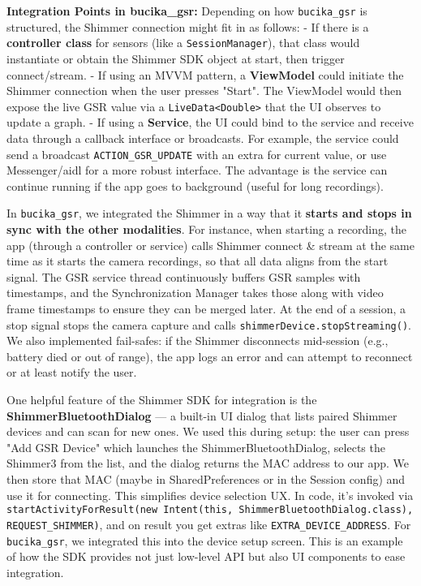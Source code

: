 \textbf{Integration Points in bucika_gsr:} Depending on how \texttt{bucika_gsr} is
structured, the Shimmer connection might fit in as follows: - If there
is a \textbf{controller class} for sensors (like a \texttt{SessionManager}), that
class would instantiate or obtain the Shimmer SDK object at start, then
trigger connect/stream. - If using an MVVM pattern, a \textbf{ViewModel}
could initiate the Shimmer connection when the user presses "Start". The
ViewModel would then expose the live GSR value via a \texttt{LiveData<Double>}
that the UI observes to update a graph. - If using a \textbf{Service}, the UI
could bind to the service and receive data through a callback interface
or broadcasts. For example, the service could send a broadcast
\texttt{ACTION_GSR_UPDATE} with an extra for current value, or use
Messenger/aidl for a more robust interface. The advantage is the service
can continue running if the app goes to background (useful for long
recordings).

In \texttt{bucika_gsr}, we integrated the Shimmer in a way that it \textbf{starts and
stops in sync with the other modalities}. For instance, when starting a
recording, the app (through a controller or service) calls Shimmer
connect & stream at the same time as it starts the camera recordings, so
that all data aligns from the start
signal\cite{MainViewModel}\cite{MainViewModel}.
The GSR service thread continuously buffers GSR samples with timestamps,
and the Synchronization Manager takes those along with video frame
timestamps to ensure they can be merged later. At the end of a session,
a stop signal stops the camera capture and calls
\texttt{shimmerDevice.stopStreaming()}. We also implemented fail-safes: if the
Shimmer disconnects mid-session (e.g., battery died or out of range),
the app logs an error and can attempt to reconnect or at least notify
the user.

One helpful feature of the Shimmer SDK for integration is the
\textbf{ShimmerBluetoothDialog} --- a built-in UI dialog that lists paired
Shimmer devices and can scan for new
ones\cite{DeviceServer}.
We used this during setup: the user can press "Add GSR Device" which
launches the ShimmerBluetoothDialog, selects the Shimmer3 from the list,
and the dialog returns the MAC address to our
app\cite{DeviceServer}.
We then store that MAC (maybe in SharedPreferences or in the Session
config) and use it for connecting. This simplifies device selection UX.
In code, it's invoked via
\texttt{startActivityForResult(new Intent(this, ShimmerBluetoothDialog.class), REQUEST_SHIMMER)},
and on result you get extras like \texttt{EXTRA_DEVICE_ADDRESS}. For
\texttt{bucika_gsr}, we integrated this into the device setup screen. This is
an example of how the SDK provides not just low-level API but also UI
components to ease integration.


